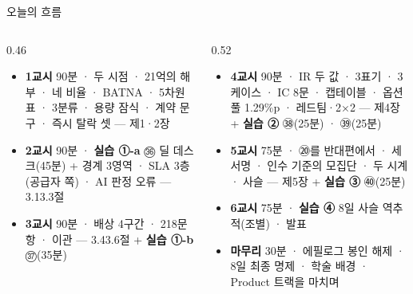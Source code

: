 \begin{frame}[shrink=10]{오늘의 흐름}
\begin{columns}[T]
\begin{column}{0.46\textwidth}
\begin{itemize}
\item \textbf{1교시} 90분 · 두 시점 · 21억의 해부 · 네 비율 · BATNA · 5차원 표 · 3분류 · 용량 잠식 · 계약 문구 · 즉시 탈락 셋 — 제1·2장
\item \textbf{2교시} 90분 · \textbf{실습 ①-a} ㊱ 딜 데스크(45분) + 경계 3영역 · SLA 3층(공급자 쪽) · AI 판정 오류 — 3.1\til{}3.3절
\item \textbf{3교시} 90분 · 배상 4구간 · 218문항 · 이관 — 3.4\til{}3.6절 + \textbf{실습 ①-b} ㊲(35분)
\end{itemize}
\end{column}
\begin{column}{0.52\textwidth}
\begin{itemize}
\item \textbf{4교시} 90분 · IR 두 값 · 3표기 · 3케이스 · IC 8문 · 캡테이블 · 옵션풀 1.29\%p · 레드팀·2×2 — 제4장 + \textbf{실습 ②} ㊳(25분) · ㊴(25분)
\item \textbf{5교시} 75분 · ⑳를 반대편에서 · 세 서명 · 인수 기준의 모집단 · 두 시계 · 사슬 — 제5장 + \textbf{실습 ③} ㊵(25분)
\item \textbf{6교시} 75분 · \textbf{실습 ④} 8일 사슬 역추적(조별) · 발표
\item \textbf{마무리} 30분 · 에필로그 봉인 해제 · 8일 최종 명제 · 학술 배경 · Product 트랙을 마치며
\end{itemize}
\end{column}
\end{columns}
\end{frame}

